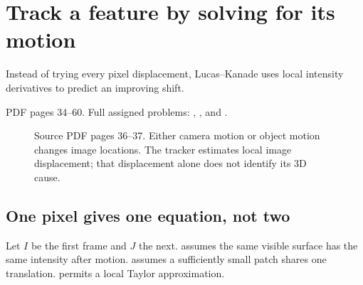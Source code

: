 \documentclass[letterpaper,11pt,english,openany,oneside]{jupyterBook}
\begin{document}
\section{Track a feature by solving for its motion}
\label{\detokenize{lectures/lecture05/tracking:track-a-feature-by-solving-for-its-motion}}\label{\detokenize{lectures/lecture05/tracking:lec05-tracking}}\label{\detokenize{lectures/lecture05/tracking::doc}}
\sphinxAtStartPar
{} Instead of trying every pixel displacement, Lucas–Kanade uses local intensity derivatives to predict an improving shift.

\sphinxAtStartPar
{} PDF pages 34–60. Full assigned problems: {\hyperref[\detokenize{lectures/lecture05/quiz-workbook:quiz-9-q1}]{}}, {\hyperref[\detokenize{lectures/lecture05/quiz-workbook:quiz-13-q1}]{}}, and {\hyperref[\detokenize{lectures/lecture05/quiz-workbook:quiz-a3-q1}]{}}.

\begin{figure}[H]
\centering
\capstart

\noindent{}
\caption{Source PDF pages 36–37. Either camera motion or object motion changes image locations. The tracker estimates local image displacement; that displacement alone does not identify its 3D cause.}\label{\detokenize{lectures/lecture05/tracking:fig-lec05-motion}}\end{figure}


\subsection{One pixel gives one equation, not two}
\label{\detokenize{lectures/lecture05/tracking:one-pixel-gives-one-equation-not-two}}
\sphinxAtStartPar
Let \(I\) be the first frame and \(J\) the next.  assumes the same visible surface has the same intensity after motion.  assumes a sufficiently small patch shares one translation.  permits a local Taylor approximation.
\end{document}
